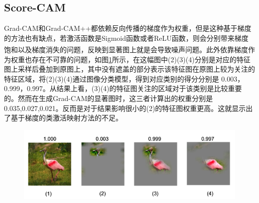 \subsection{Score-CAM}
Grad-CAM和Grad-CAM++都依赖反向传播的梯度作为权重，但是这种基于梯度的方法也有缺点，若激活函数是Sigmoid函数或者ReLU函数，则会分别带来梯度饱和以及梯度消失的问题\textsuperscript{\cite{simonyan2014visualising}}，反映到显著图上就是会导致噪声问题。此外依靠梯度作为权重也存在不可靠的问题，如图\ref{fig:scorecam1}所示，在这幅图中(2)(3)(4)分别是对应的特征图上采样后叠加到原图上，其中没有遮盖的部分表示该特征图在原图上较为关注的特征区域，将(2)(3)(4)通过图像分类模型，得到对应类别的得分分别是 0.003，0.999，0.997。从结果上看，(3)(4)的特征图关注的区域对于该类别是比较重要的。然而在生成Grad-CAM的显著图时，这三者计算出的权重分别是0.035,0.027,0.021。反而是对于结果影响很小的(2)的特征图权重更高。这就显示出了基于梯度的类激活映射方法的不足。


\begin{figure}[h]
	\centering 
	\includegraphics[width=15cm]{fig/ch2/scorecam1.png}
	\label{fig:scorecam1}
\end{figure}

